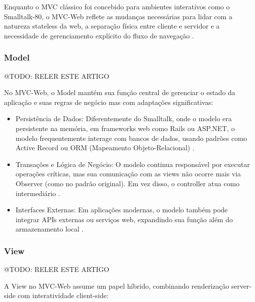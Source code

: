         \par Enquanto o MVC clássico foi concebido para ambientes interativos como o Smalltalk-80, o MVC-Web reflete as mudanças necessárias para lidar com a natureza stateless da web, a separação física entre cliente e servidor e a necessidade de gerenciamento explícito do fluxo de navegação \cite{inproceedings:grove:2011}.

        \subsubsection{Model}
            \par @TODO: RELER ESTE ARTIGO
            \par No MVC-Web, o Model mantém sua função central de gerenciar o estado da aplicação e suas regras de negócio mas com adaptações significativas:

            \begin{itemize}
                \item Persistência de Dados: Diferentemente do Smalltalk, onde o modelo era persistente na memória, em frameworks web como Rails ou ASP.NET, o modelo frequentemente interage com bancos de dados, usando padrões como Active Record ou ORM (Mapeamento Objeto-Relacional) \cite{inproceedings:grove:2011}.
                
                \item Transações e Lógica de Negócio: O modelo continua responsável por executar operações críticas, mas sua comunicação com as views não ocorre mais via Observer (como no padrão original). Em vez disso, o controller atua como intermediário \cite{inproceedings:grove:2011}.
                
                \item Interfaces Externas: Em aplicações modernas, o modelo também pode integrar APIs externas ou serviços web, expandindo sua função além do armazenamento local \cite{inproceedings:grove:2011}.
            \end{itemize}


        \subsubsection{View}
            \par @TODO: RELER ESTE ARTIGO
            \par A View no MVC-Web assume um papel híbrido, combinando renderização server-side com interatividade client-side:

